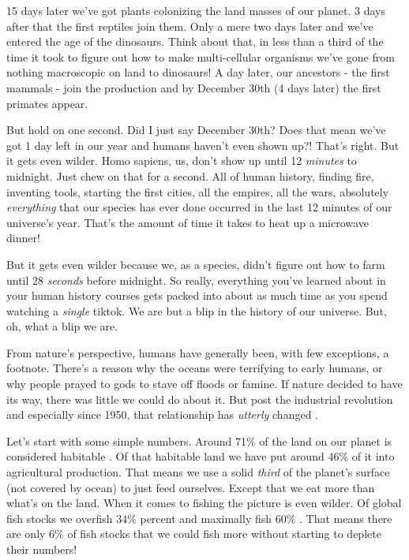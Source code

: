 \documentclass[11pt,a5paper]{book}
\begin{document}
15 days later we've got plants colonizing the land masses of our planet. 3 days after that the first reptiles join them. Only a mere two days later and we've entered the age of the dinosaurs. Think about that, in less than a third of the time it took to figure out how to make multi-cellular organisms we've gone from nothing macroscopic on land to dinosaurs! A day later, our ancestors - the first mammals - join the production and by December 30th (4 days later) the first primates appear. 

But hold on one second. Did I just say December 30th? Does that mean we've got 1 day left in our year and humans haven't even shown up?! That's right. But it gets even wilder. Homo sapiens, us, don't show up until 12 \textit{minutes} to midnight. Just chew on that for a second. All of human history, finding fire, inventing tools, starting the first cities, all the empires, all the wars, absolutely \textit{everything} that our species has ever done occurred in the last 12 minutes of our universe's year. That's the amount of time it takes to heat up a microwave dinner!

But it gets even wilder because we, as a species, didn't figure out how to farm until 28 \textit{seconds} before midnight. So really, everything you've learned about in your human history courses gets packed into about as much time as you spend watching a \textit{single} tiktok. We are but a blip in the history of our universe. But, oh, what a blip we are. 
\newline

From nature's perspective, humans have generally been, with few exceptions, a footnote. There's a reason why the oceans were terrifying to early humans, or why people prayed to gods to stave off floods or famine. If nature decided to have its way, there was little we could do about it. But post the industrial revolution and especially since 1950, that relationship has \textit{utterly} changed \cite{eellis}.

Let's start with some simple numbers. Around 71\% of the land on our planet is considered habitable \cite{hritchie}. Of that habitable land we have put around 46\% of it into agricultural production. That means we use a solid \textit{third} of the planet's surface (not covered by ocean) to just feed ourselves. Except that we eat more than what's on the land. When it comes to fishing the picture is even wilder. Of global fish stocks we overfish 34\% percent and maximally fish 60\% \cite{mroser}. That means there are only 6\% of fish stocks that we could fish more without starting to deplete their numbers!
\end{document}
